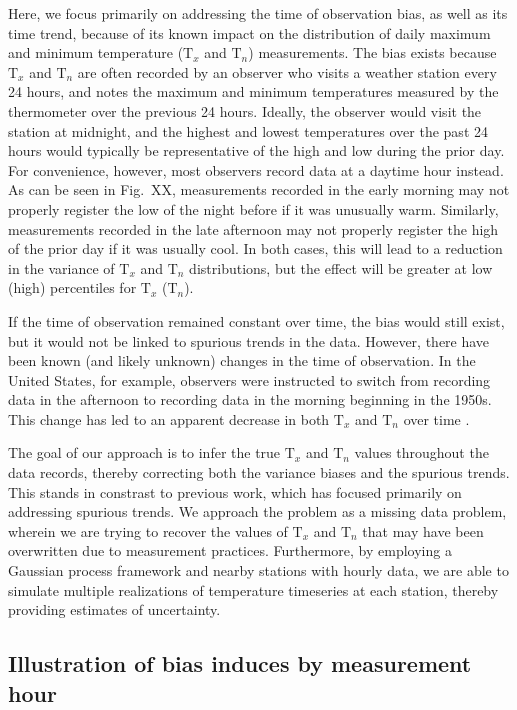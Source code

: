 \documentclass[letter]{article}
\newcommand{\T}{\mathrm{T}}
\newcommand{\Tn}{\T_{n}}
\newcommand{\Tx}{\T_{x}}
\begin{document}
Here, we focus primarily on addressing the time of observation bias, as well as its time trend, because of its known impact on the distribution of daily maximum and minimum temperature ($\Tx$ and $\Tn$) measurements. The bias exists because $\Tx$ and $\Tn$ are often recorded by an observer who visits a weather station every 24 hours, and notes the maximum and minimum temperatures measured by the thermometer over the previous 24 hours. Ideally, the observer would visit the station at midnight, and the highest and lowest temperatures over the past 24 hours would typically be representative of the high and low during the prior day. For convenience, however, most observers record data at a daytime hour instead. As can be seen in Fig.~XX, measurements recorded in the early morning may not properly register the low of the night before if it was unusually warm. Similarly, measurements recorded in the late afternoon may not properly register the high of the prior day if it was usually cool. In both cases, this will lead to a reduction in the variance of $\Tx$ and $\Tn$ distributions, but the effect will be greater at low (high) percentiles for $\Tx$ ($\Tn$). 

If the time of observation remained constant over time, the bias would still exist, but it would not be linked to spurious trends in the data. However, there have been known (and likely unknown) changes in the time of observation. In the United States, for example, observers were instructed to switch from recording data in the afternoon to recording data in the morning beginning in the 1950s. This change has led to an apparent decrease in both $\Tx$ and $\Tn$ over time \citep{menne2009us}. 

The goal of our approach is to infer the true $\Tx$ and $\Tn$ values throughout the data records, thereby correcting both the variance biases and the spurious trends. This stands in constrast to previous work, which has focused primarily on addressing spurious trends. We approach the problem as a missing data problem, wherein we are trying to recover the values of $\Tx$ and $\Tn$ that may have been overwritten due to measurement practices. Furthermore, by employing a Gaussian process framework and nearby stations with hourly data, we are able to simulate multiple realizations of temperature timeseries at each station, thereby providing estimates of uncertainty.
        \subsection{Illustration of bias induces by measurement hour}\label{illustration-of-bias-induces-by-measurement-hour}
    
\end{document}
